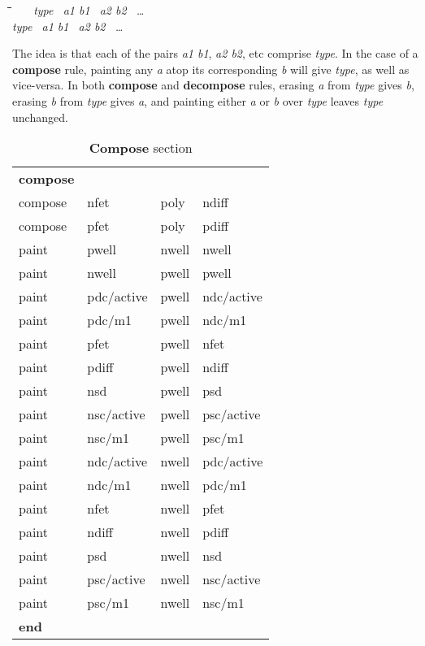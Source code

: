 \documentclass[letterpaper,twoside,12pt]{article}
\def\hinch{\hspace*{0.5in}}
\def\starti{\begin{center}\begin{tabbing}\hinch\=\hinch\=\hinch\=\hinch\=\kill}
\def\endi{\end{tabbing}\end{center}}
\def\ii{\>\>\>}
\begin{document}
\starti
   \ii {\bfseries compose} {\itshape\ \ \ type \ a1 b1 \ a2 b2 \ \dots} \\
   \ii {\bfseries decompose} {\itshape  type \ a1 b1 \ a2 b2 \ \dots}
\endi

The idea is that each of the pairs {\itshape a1 b1}, {\itshape a2 b2}, etc
comprise {\itshape type}.
In the case of a {\bfseries compose} rule,
painting any {\itshape a} atop its corresponding {\itshape b}
will give {\itshape type}, as well as vice-versa.
In both {\bfseries compose} and {\bfseries decompose} rules, erasing {\itshape a} from
{\itshape type} gives {\itshape b}, erasing {\itshape b} from {\itshape type} gives
{\itshape a}, and painting either {\itshape a} or {\itshape b} over {\itshape type}
leaves {\itshape type} unchanged.

\begin{table}[ht]
   \begin{center}
      \begin{tabular}{|llll|} \hline
	{\bfseries compose} \\
	compose	& nfet		& poly	& ndiff \\
	compose	& pfet		& poly	& pdiff \\
	paint	& pwell		& nwell	& nwell \\
	paint	& nwell		& pwell	& pwell \\
	paint	& pdc/active	& pwell	& ndc/active \\
	paint	& pdc/m1	& pwell	& ndc/m1 \\
	paint	& pfet		& pwell	& nfet \\
	paint	& pdiff		& pwell	& ndiff \\
	paint	& nsd		& pwell	& psd \\
	paint	& nsc/active	& pwell	& psc/active \\
	paint	& nsc/m1	& pwell	& psc/m1 \\
	paint	& ndc/active	& nwell	& pdc/active \\
	paint	& ndc/m1	& nwell	& pdc/m1 \\
	paint	& nfet		& nwell	& pfet \\
	paint	& ndiff		& nwell	& pdiff \\
	paint	& psd		& nwell	& nsd \\
	paint	& psc/active	& nwell	& nsc/active \\
	paint	& psc/m1	& nwell	& nsc/m1 \\
	{\bfseries end} &&& \\ \hline
      \end{tabular}
      \caption{{\bfseries Compose} section}
      \label{compose}
   \end{center}
\end{table}
\end{document}
